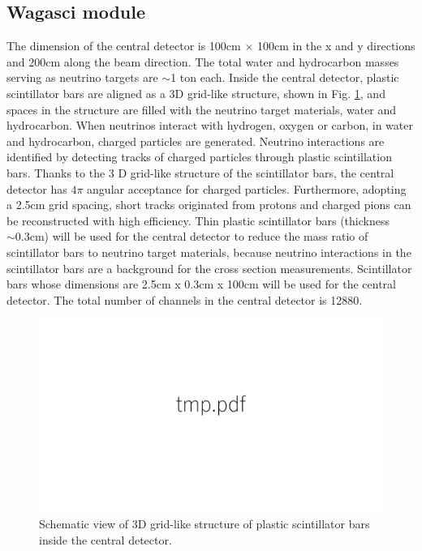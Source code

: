 \subsection{Wagasci module}
The dimension of the central detector is 100cm $\times$ 100cm in the x and y directions
and 200cm along the beam direction.
The total water and hydrocarbon masses serving as neutrino targets are $\sim$1 ton each.
Inside the central detector, plastic scintillator bars are aligned as a 3D grid-like structure, shown in Fig. \ref{fig:3dgrid},
and spaces in the structure are filled with the neutrino target materials, water and hydrocarbon.
When neutrinos interact with hydrogen, oxygen or carbon, in water and hydrocarbon,
charged particles are generated.
Neutrino interactions are identified by detecting tracks of charged particles through plastic scintillation bars.
Thanks to the 3 D grid-like structure of the scintillator bars, 
the central detector has $4\pi$ angular acceptance for charged particles.
Furthermore, adopting a 2.5cm grid spacing, short tracks originated from protons and charged pions can be reconstructed
with high efficiency.
Thin plastic scintillator bars (thickness $\sim 0.3$cm) will be used for the central detector
to reduce  the mass ratio of scintillator bars to neutrino target materials,
because neutrino interactions in the scintillator bars are a background for the cross section measurements.
Scintillator bars whose dimensions are 2.5cm x 0.3cm x 100cm will be used for the central detector.
The total number of channels in the central detector is 12880.

\begin{figure}[tbh]
\begin{center}
\includegraphics[width=0.6\linewidth]{fig/tmp.pdf}
\end{center}
\caption{
Schematic view of 3D grid-like structure of plastic scintillator bars inside the central detector.
}
\label{fig:3dgrid}
\end{figure}
